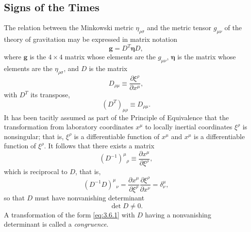 
\subsection{Signs of the Times}\label{sec:3.6}

The relation between the Minkowski metric $\eta_{\rho\sigma}$ and the metric
tensor $g_{\mu\nu}$ of the theory of gravitation may be expressed in matrix
notation
\begin{equation}
  \mathbf g=D^T\boldsymbol\eta D,
  \tag{3.6.1}\label{eq:3.6.1}
\end{equation}
where $\mathbf g$ is the $4\times4$ matrix whose elements are the
$g_{\mu\nu}$, $\boldsymbol\eta$ is the matrix whose elements are the
$\eta_{\rho\sigma}$, and $D$ is the matrix
\begin{equation}
  D_{\rho\mu}\equiv\frac{\partial\xi^\rho}{\partial x^\mu},
  \tag{3.6.2}\label{eq:3.6.2}
\end{equation}
with $D^T$ its transpose,
\[
  (D^T)_{\mu\rho}\equiv D_{\rho\mu}.
\]
It has been tacitly assumed as part of the Principle of Equivalence that the
transformation from laboratory coordinates $x^\mu$ to locally inertial
coordinates $\xi^\rho$ is nonsingular; that is, $\xi^\rho$ is a
differentiable function of $x^\mu$ and $x^\mu$ is a differentiable function
of $\xi^\rho$. It follows that there exists a matrix
\begin{equation}
  (D^{-1})^\mu{}_\rho\equiv
  \frac{\partial x^\mu}{\partial\xi^\rho},
  \tag{3.6.3}\label{eq:3.6.3}
\end{equation}
which is reciprocal to $D$, that is,
\[
  (D^{-1}D)^\mu{}_\nu
  =\frac{\partial x^\mu}{\partial\xi^\rho}
  \frac{\partial\xi^\rho}{\partial x^\nu}
  =\delta^\mu_\nu,
\]
so that $D$ must have nonvanishing determinant
\begin{equation}
  \det D\ne0.
  \tag{3.6.4}\label{eq:3.6.4}
\end{equation}
A transformation of the form \eqref{eq:3.6.1} with $D$ having a
nonvanishing determinant is called a \emph{congruence}.

